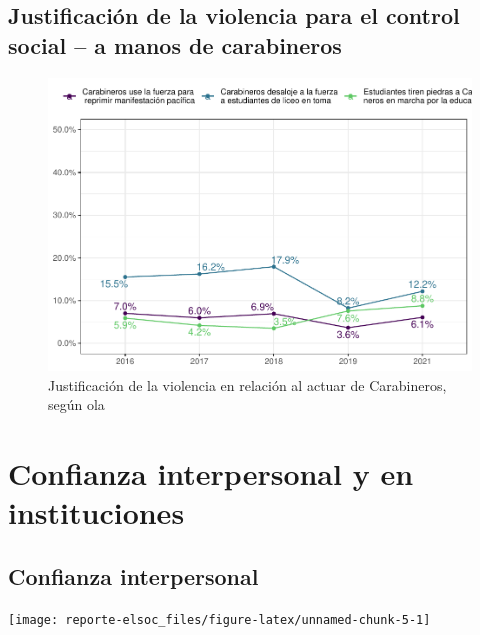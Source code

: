 \documentclass[
  12pt,
]{book}
\begin{document}
\hypertarget{justificaciuxf3n-de-la-violencia-para-el-control-social-a-manos-de-carabineros}{%
\subsection{Justificación de la violencia para el control social -- a manos de carabineros}\label{justificaciuxf3n-de-la-violencia-para-el-control-social-a-manos-de-carabineros}}

\begin{figure}

{\centering \includegraphics{reporte-elsoc_files/figure-latex/just-carab-ola-1} 

}

\caption{Justificación de la violencia en relación al actuar de Carabineros, según ola}\label{fig:just-carab-ola}
\end{figure}

\hypertarget{confianza-interpersonal-y-en-instituciones}{%
\section{Confianza interpersonal y en instituciones}\label{confianza-interpersonal-y-en-instituciones}}

\hypertarget{confianza-interpersonal}{%
\subsection{Confianza interpersonal}\label{confianza-interpersonal}}

\begin{center}\texttt{[image: reporte-elsoc\_files/figure-latex/unnamed-chunk-5-1]} \end{center}
\end{document}
